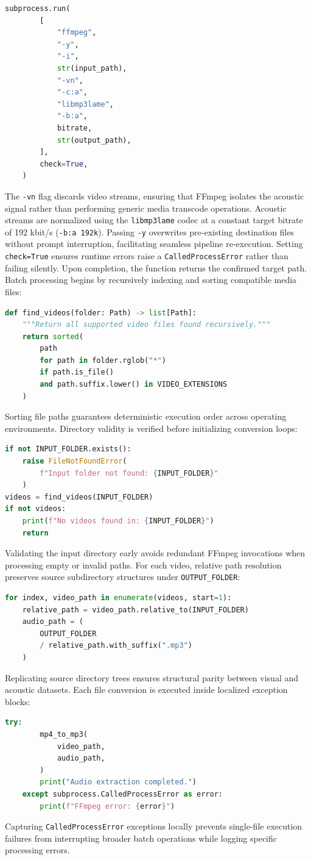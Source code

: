 \begin{lstlisting}[language=Python, xleftmargin=2em]
    subprocess.run(
        [
            "ffmpeg",
            "-y",
            "-i",
            str(input_path),
            "-vn",
            "-c:a",
            "libmp3lame",
            "-b:a",
            bitrate,
            str(output_path),
        ],
        check=True,
    )
\end{lstlisting}
The \texttt{-vn} flag discards video streams, ensuring that FFmpeg isolates the acoustic signal rather than performing generic media transcode operations.
Acoustic streams are normalized using the \texttt{libmp3lame} codec at a constant target bitrate of 192 kbit/s (\texttt{-b:a 192k}). Passing \texttt{-y} overwrites pre-existing destination files without prompt interruption, facilitating seamless pipeline re-execution. Setting \texttt{check=True} ensures runtime errors raise a \texttt{CalledProcessError} rather than failing silently.
Upon completion, the function returns the confirmed target path. Batch processing begins by recursively indexing and sorting compatible media files:
\begin{lstlisting}[language=Python, xleftmargin=2em]
def find_videos(folder: Path) -> list[Path]:
    """Return all supported video files found recursively."""
    return sorted(
        path
        for path in folder.rglob("*")
        if path.is_file()
        and path.suffix.lower() in VIDEO_EXTENSIONS
    )
\end{lstlisting}
Sorting file paths guarantees deterministic execution order across operating environments.
Directory validity is verified before initializing conversion loops:
\begin{lstlisting}[language=Python, xleftmargin=2em]
if not INPUT_FOLDER.exists():
    raise FileNotFoundError(
        f"Input folder not found: {INPUT_FOLDER}"
    )
videos = find_videos(INPUT_FOLDER)
if not videos:
    print(f"No videos found in: {INPUT_FOLDER}")
    return
\end{lstlisting}
Validating the input directory early avoids redundant FFmpeg invocations when processing empty or invalid paths.
For each video, relative path resolution preserves source subdirectory structures under \texttt{OUTPUT\_FOLDER}:
\begin{lstlisting}[language=Python, xleftmargin=2em]
for index, video_path in enumerate(videos, start=1):
    relative_path = video_path.relative_to(INPUT_FOLDER)
    audio_path = (
        OUTPUT_FOLDER
        / relative_path.with_suffix(".mp3")
    )
\end{lstlisting}
Replicating source directory trees ensures structural parity between visual and acoustic datasets.
Each file conversion is executed inside localized exception blocks:
\begin{lstlisting}[language=Python, xleftmargin=2em]
    try:
        mp4_to_mp3(
            video_path,
            audio_path,
        )
        print("Audio extraction completed.")
    except subprocess.CalledProcessError as error:
        print(f"FFmpeg error: {error}")
\end{lstlisting}
Capturing \texttt{CalledProcessError} exceptions locally prevents single-file execution failures from interrupting broader batch operations while logging specific processing errors.
